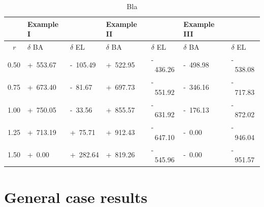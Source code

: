 	\begin{table}
		\centering
		\begin{tabular}[c]{| c || l | l || l | l || l | l |}
			\hline
			& Example I & & Example II & & Example III & \\
			\hline
			\hline
			\textit{r} & $\delta$ BA & $\delta$ EL & $\delta$ BA & $\delta$ EL & $\delta$ BA & $\delta$ EL\\ 
			\hline
			0.50 & +~553.67 & -~105.49 & +~522.95 & -~436.26 & -~498.98 & -~538.08 \\ 
			0.75 & +~673.40 & -~81.67 & +~697.73 & -~551.92 & -~346.16 & -~717.83  \\ 
			1.00 & +~750.05 & -~33.56 & +~855.57 & -~631.92 & -~176.13 & -~872.02 \\ 
			1.25 & +~713.19 & +~75.71 & +~912.43 & -~647.10 & -~0.00 & -~946.04 \\ 
			1.50 & +~0.00 & +~282.64 & +~819.26 & -~545.96 & -~0.00 & -~951.57  \\ 
			\hline
		\end{tabular}
		\caption{Bla}
		\label{tab:update_examples_all}
	\end{table}
		
	\section{General case results}